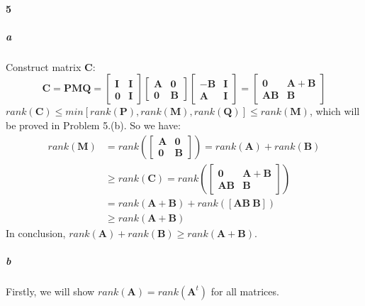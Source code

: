 \documentclass[22pt]{article}
\begin{document}
   	\paragraph{5} 
   		\subparagraph{a} Construct matrix $\mathbf{C}$:
   		\begin{equation}
   			\mathbf{C} = \mathbf{PMQ} = \left[ \begin{array}{cc} \mathbf{I}& \mathbf{I}\\ \mathbf{0} & \mathbf{I} 
   		\end{array} \right]\left[ \begin{array}{cc} \mathbf{A}& \mathbf{0}\\ \mathbf{0} & \mathbf{B} 
   		\end{array} \right]\left[ \begin{array}{cc} -\mathbf{B}& \mathbf{I}\\ \mathbf{A} & \mathbf{I} 
   		\end{array} \right] = \left[ \begin{array}{cc} \mathbf{0}& \mathbf{A+B}\\ \mathbf{AB} & \mathbf{B}
   		\end{array} \right]
   		\end{equation}
   		$rank(\mathbf{C})\leq min[rank(\mathbf{P}),rank(\mathbf{M}),rank(\mathbf{Q})]\leq rank(\mathbf{M})$, which will be proved in Problem 5.(b).
   		So we have:
   		\begin{align}
   			rank(\mathbf{M}) &= rank(\left[ \begin{array}{cc} \mathbf{A}& \mathbf{0}\\ \mathbf{0} & \mathbf{B} 
   		\end{array} \right]) = rank(\mathbf{A})+rank(\mathbf{B}) \\ &\geq rank(\mathbf{C}) = rank(\left[ \begin{array}{cc} \mathbf{0}& \mathbf{A+B}\\ \mathbf{AB} & \mathbf{B}
   		\end{array} \right])\\
   		& = rank(\mathbf{A+B})+ rank([\mathbf{AB}\ \mathbf{B}])\\ 
   		& \geq rank(\mathbf{A+B})
   		\end{align}
   		In conclusion, $ rank(\mathbf{A})+rank(\mathbf{B})\geq rank(\mathbf{A+B})$.

   		\subparagraph{b} Firstly, we will show $rank(\mathbf{A}) = rank(\mathbf{A}^t)$ for all matrices. 
\end{document}
